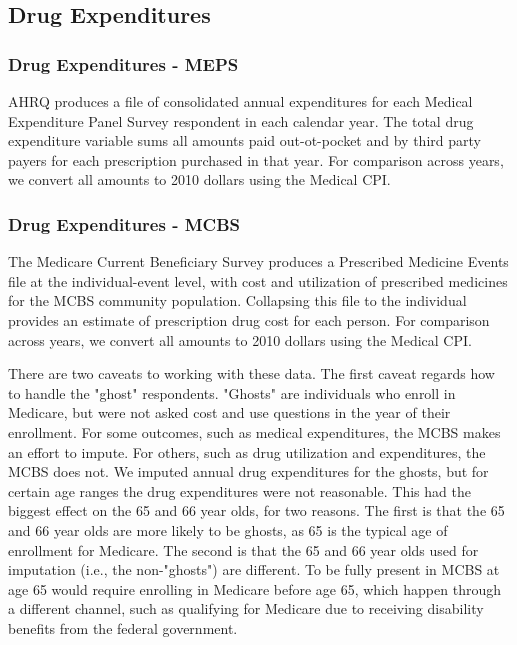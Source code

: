 \subsection{Drug Expenditures}
\label{sec:model_development_rxexp}

\subsubsection{Drug Expenditures - MEPS}
\label{sec:model_development_rxexp_meps}
AHRQ produces a file of consolidated annual expenditures for each Medical Expenditure Panel Survey respondent in each calendar year.  
The total drug expenditure variable sums all amounts paid out-ot-pocket and by third party payers for each prescription
purchased in that year.  For comparison across years, we convert all amounts to 2010 dollars using the Medical CPI.

\subsubsection{Drug Expenditures - MCBS}
\label{sec:model_development_rxexp_mcbs}
The Medicare Current Beneficiary Survey produces a Prescribed Medicine Events file at the individual-event level, with cost
and utilization of prescribed medicines for the MCBS community population.  Collapsing this file to the individual provides an
estimate of prescription drug cost for each person.  For comparison across years, we convert all amounts to 2010 dollars using the Medical CPI.


There are two caveats to working with these data.  The first caveat regards how to handle the "ghost" respondents.  
"Ghosts" are individuals who enroll in Medicare, but were not
asked cost and use questions in the year of their enrollment.  For some outcomes, such as medical expenditures, the MCBS makes an 
effort to impute.  For others, such as drug utilization and expenditures, the MCBS does not.  We imputed annual drug expenditures 
for the ghosts, but for certain age ranges the drug expenditures were not reasonable.  This had the biggest effect on the 65 and 66 
year olds, for two reasons.  The first is that the 65 and 66 year olds are more likely to be ghosts, as 65 is the typical age of 
enrollment for Medicare.  The second is that the 65 and 66 year olds used for imputation (i.e., the non-"ghosts") are different.  To 
be fully present in MCBS at age 65 would require enrolling in Medicare before age 65, which happen through a different channel, such
as qualifying for Medicare due to receiving disability benefits from the federal government.  

